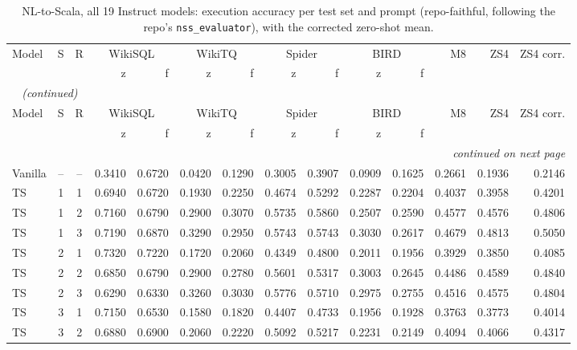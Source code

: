 {\footnotesize
{}
\setlength{\tabcolsep}{4.2pt}
\begin{longtable}{@{}lccrrrrrrrrrrr@{}}
\caption{NL-to-Scala, all 19 Instruct models: execution accuracy per test set and prompt (repo-faithful, following the repo's \texttt{nss\_evaluator}), with the corrected zero-shot mean.}\label{tab:gen-scala}\\
\toprule
\rowcolor{headshade}Model & S & R & \multicolumn{2}{c}{WikiSQL} & \multicolumn{2}{c}{WikiTQ} & \multicolumn{2}{c}{Spider} & \multicolumn{2}{c}{BIRD} & M8 & ZS4 & ZS4 corr.\\\rowcolor{headshade} & & & z & f & z & f & z & f & z & f & & &\\
\midrule
\endfirsthead
\multicolumn{14}{l}{\textit{\tablename~\thetable{} (continued)}}\\
\toprule
\rowcolor{headshade}Model & S & R & \multicolumn{2}{c}{WikiSQL} & \multicolumn{2}{c}{WikiTQ} & \multicolumn{2}{c}{Spider} & \multicolumn{2}{c}{BIRD} & M8 & ZS4 & ZS4 corr.\\\rowcolor{headshade} & & & z & f & z & f & z & f & z & f & & &\\
\midrule
\endhead
\midrule
\multicolumn{14}{r}{\textit{continued on next page}}\\
\endfoot
\bottomrule
\endlastfoot
Vanilla & -- & -- & 0.3410 & 0.6720 & 0.0420 & 0.1290 & 0.3005 & 0.3907 & 0.0909 & 0.1625 & 0.2661 & 0.1936 & 0.2146\\
\midrule
TS & 1 & 1 & 0.6940 & 0.6720 & 0.1930 & 0.2250 & 0.4674 & 0.5292 & 0.2287 & 0.2204 & 0.4037 & 0.3958 & 0.4201\\
TS & 1 & 2 & 0.7160 & 0.6790 & 0.2900 & 0.3070 & 0.5735 & 0.5860 & 0.2507 & 0.2590 & 0.4577 & 0.4576 & 0.4806\\
TS & 1 & 3 & 0.7190 & 0.6870 & 0.3290 & 0.2950 & 0.5743 & 0.5743 & 0.3030 & 0.2617 & 0.4679 & 0.4813 & 0.5050\\
TS & 2 & 1 & 0.7320 & 0.7220 & 0.1720 & 0.2060 & 0.4349 & 0.4800 & 0.2011 & 0.1956 & 0.3929 & 0.3850 & 0.4085\\
TS & 2 & 2 & 0.6850 & 0.6790 & 0.2900 & 0.2780 & 0.5601 & 0.5317 & 0.3003 & 0.2645 & 0.4486 & 0.4589 & 0.4840\\
TS & 2 & 3 & 0.6290 & 0.6330 & 0.3260 & 0.3030 & 0.5776 & 0.5710 & 0.2975 & 0.2755 & 0.4516 & 0.4575 & 0.4804\\
TS & 3 & 1 & 0.7150 & 0.6530 & 0.1580 & 0.1820 & 0.4407 & 0.4733 & 0.1956 & 0.1928 & 0.3763 & 0.3773 & 0.4014\\
TS & 3 & 2 & 0.6880 & 0.6900 & 0.2060 & 0.2220 & 0.5092 & 0.5217 & 0.2231 & 0.2149 & 0.4094 & 0.4066 & 0.4317\\

\end{longtable}}

